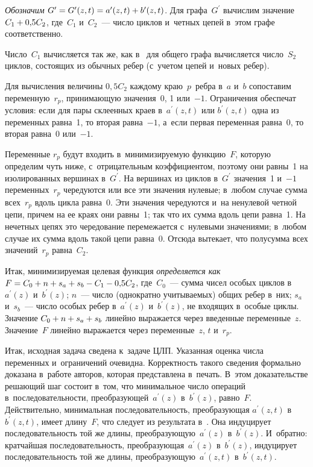 \begin{multicols}{2}
  \textit{Обозначим} 
$G^\prime\hm=G^\prime(z, t)\hm=a^\prime(z, t)\hm+b^\prime(z, t)$. Для 
графа~$G^\prime$ вычислим значение $C_1\hm+0{,}5C_2$, где~$C_1$ 
и~$C_2$~--- число циклов и~четных цепей в~этом графе соответственно.
  
  Число~$C_1$ вычисляется так же, как в~\cite{3-gor} для общего графа 
вычисляется число~$S_2$ циклов, состоящих из обычных ребер (с~учетом 
цепей и~новых ре\-бер). 
{

}
  
  Для вычисления величины $0{,}5C_2$ каждому краю~$p$~реб\-ра в~$a$ 
и~$b$ сопоставим переменную~$r_p$, принимающую значения~0, 1 или~$-1$. 
Ограничения обеспечат условия: если для пары склеенных краев 
в~$a^\prime(z, t)$ или $b^\prime(z, t)$ одна из переменных рав\-на~1, то вторая 
равна~$-1$, а~если первая переменная рав\-на~0, то вторая рав\-на~0 или~$-1$. 
  
  Переменные $r_p$ будут входить в~минимизиру\-емую функцию~$F$, которую 
определим чуть ниже, с~отрицательным коэффициентом, поэтому они равны~1 
на изолированных вершинах в~$G^\prime$. На вершинах из циклов 
в~$G^\prime$ значения~1 и~$-1$ переменных~$r_p$ чередуются или все эти 
значения нулевые; в~любом случае сумма всех~$r_p$ вдоль цикла равна~0. Эти 
значения чередуются и~на ненулевой четной цепи, причем на ее краях они 
равны~1; так что их сумма вдоль цепи равна~1. На нечетных цепях это 
чередование перемежается с~нулевыми значениями; в~любом случае их сумма 
вдоль такой цепи равна~0. Отсюда вытекает, что полусумма всех 
значений~$r_p$ равна~$C_2$.
  
  Итак, минимизируемая целевая функция \textit{определяется как} 
$F\hm=C_0\hm+n\hm+s_a\hm+s_b\hm- C_1\hm- 0{,}5C_2$, где~$C_0$~--- сумма чисел 
особых циклов в~$a^\prime(z)$ и~$b^\prime(z)$; $n$~--- число (однократно 
учитываемых) общих ребер в~них; $s_a$ и~$s_b$~--- число особых ребер 
в~$a^\prime(z)$ и~$b^\prime(z)$, не входящих в~особые циклы. Значение 
$C_0\hm+n\hm+s_a\hm+s_b$ линейно выражается через введенные 
переменные~$z$. Значение~$F$ линейно выражается через переменные~$z$, 
$t$ и~$r_p$.
  
  Итак, исходная задача сведена к~задаче ЦЛП. Указанная оценка числа 
переменных и~ограничений очевидна. Корректность такого сведения формально 
доказана в~работе авторов, которая пред\-став\-ле\-на в~печать. В~этом 
доказательстве решающий шаг состоит в~том, что минимальное число операций в~последовательности, преобразующей~$a^\prime(z)$ в~$b^\prime(z)$, 
равно~$F$. Действительно, минимальная последовательность, преобразующая 
$a^\prime(z, t)$ в~$b^\prime(z, t)$, имеет длину~$F$, что следует из результата 
в~\cite{2-gor}. Она индуцирует последовательность той же длины, 
преобразующую~$a^\prime(z)$ в~$b^\prime(z)$. И~обратно: кратчайшая 
последовательность, преобразующая~$a^\prime(z)$ в~$b^\prime(z)$, индуцирует 
последовательность той же длины, преобразующую~$a^\prime(z, t)$ 
в~$b^\prime(z, t)$. 
  

\end{multicols}

